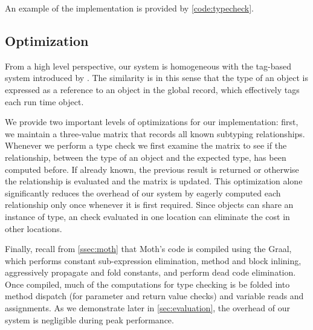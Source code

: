 An example of the implementation is provided by \cref{code:typecheck}.








\subsection{Optimization}
\label{sec:optimization}

From a high level perspective, 
our system is homogeneous with the tag-based system introduced by \citet{Greenman2017}.
The similarity is in this sense that the type of an object is expressed as a reference
to an object in the global record, which
effectively tags each run time object.

We provide two important levels of optimizations for our implementation: 
first, we maintain a three-value matrix that records all known subtyping relationships. 
Whenever we perform a type check we first examine the matrix to see if the relationship, 
between the type of an object and the expected type, has been computed before.
If already known, the previous result is returned 
or otherwise the relationship is evaluated and the matrix is updated.
This optimization alone significantly reduces the overhead of our system 
by eagerly computed each relationship only once whenever it is first required. 
Since objects can share an instance of type,
an check evaluated in one location can eliminate the cost in other locations.

Finally, recall from \cref{ssec:moth} that
Moth's code is compiled using the Graal, 
which performs
constant sub-expression elimination,
method and block inlining,
aggressively propagate and fold constants, and
perform dead code elimination.
Once compiled, much of the computations for type checking
is be folded into method dispatch
(for parameter and return value checks)
and variable reads and assignments.
As we demonstrate later in \cref{sec:evaluation}, 
the overhead of our system is negligible during peak performance.
